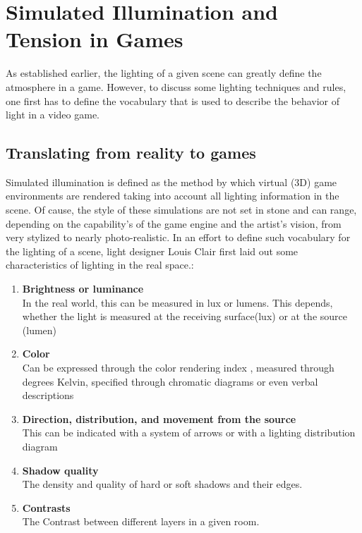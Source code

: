 \chapter{Simulated Illumination and Tension in Games}
As established earlier, the lighting of a given scene can greatly define the atmosphere in a game. However, to discuss some lighting techniques and rules, one first has to define the vocabulary that is used to describe the behavior of light in a video game.

\section{Translating from reality to games}

Simulated illumination is defined as the method by which virtual (3D) game environments are rendered taking into account all lighting information in the scene.\cite{Maggi.2006} Of cause, the style of these simulations are not set in stone and can range, depending on the capability's of the game engine and the artist's vision, from very stylized to nearly photo-realistic. In an effort to define such vocabulary for the lighting of a scene, light designer Louis Clair first laid out some characteristics of lighting in the real space.\cite{Niedenthal1404353}:

\begin{enumerate}
    \item \textbf{Brightness or luminance} \\
    In the real world, this can be measured in lux or lumens. This depends, whether the light is measured at the receiving surface(lux) or at the source (lumen) \cite{LuxAndLumens}
    \item\textbf{Color} \\
    Can be expressed through the color rendering index \cite{colorrendering}, measured through degrees Kelvin, specified through chromatic diagrams or even verbal descriptions
    \item \textbf{Direction, distribution, and movement from the source} \\
    This can be indicated with a system of arrows or with a lighting distribution diagram \cite{dmlights}
    \item \textbf{Shadow quality}\\
    The density and quality of hard or soft shadows and their edges.
    \item \textbf{Contrasts}\\
    The Contrast between different layers in a given room.
\end{enumerate}



